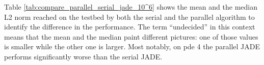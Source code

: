 \documentclass[./\jobname.tex]{subfiles}
\begin{document}
\begin{figure}[h]
	\centering
	\noindent{}
	\label{fig:parallel_jade_memory_boxplot}
\end{figure}
Table \ref{tab:compare_parallel_serial_jade_10^6} shows the mean and the median L2 norm reached on the testbed by both the serial and the parallel algorithm to identify the difference in the performance. The term ``undecided'' in this context means that the mean and the median paint different pictures: one of those values is smaller while the other one is larger. Most notably, on \gls{pde} 4 the parallel JADE performs significantly worse than the serial JADE. 
\end{document}
